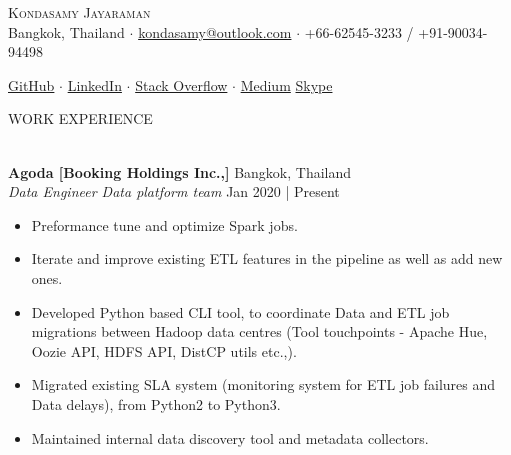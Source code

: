 \documentclass[a4paper]{article}
\newcommand{\lineunder} {
    \vspace*{-8pt} \\
    \hspace*{-18pt} \hrulefill \\
}
\newcommand{\header} [1] {
    {\hspace*{-18pt}\vspace*{6pt} \textsc{#1}}
    \vspace*{-6pt} \lineunder
}
\begin{document}
\vspace*{-50pt}

    

\vspace*{-12pt}
\begin{center}
	{\Huge \scshape {Kondasamy Jayaraman}}\\
	\vspace{1mm}
	\faMapMarker \hspace{.5mm} Bangkok, Thailand $\cdot$ 
	\faEnvelope \hspace{.5mm} \href{mailto:kondasamy@outlook.com}{kondasamy@outlook.com} $\cdot$ \faMobile \hspace{.5mm} +66-62545-3233 / \faWhatsapp  \hspace{.5mm} +91-90034-94498
		
	\faGithub \hspace{.5mm} \href{https://github.com/Kondasamy}{GitHub} $\cdot$
	\faLinkedin \hspace{.5mm} \href{https://www.linkedin.com/in/kondasamy/}{LinkedIn} $\cdot$
	\faStackOverflow \hspace{.5mm} \href{https://stackoverflow.com/users/2094099/kondasamy-jayaraman}{Stack Overflow} $\cdot$
	\faMedium \hspace{.5mm} \href{https://medium.com/@kondasamy}{Medium}
	\faSkype \hspace{.5mm} \href{https://join.skype.com/invite/n0IMYwGkGwQ1}{Skype}\\
\end{center}

\header{WORK EXPERIENCE}
\vspace{1mm}

\textbf{Agoda [Booking Holdings Inc.,]} \hfill Bangkok, Thailand\\
\textit{Data Engineer \textbar{} Data platform team} \hfill Jan 2020 | Present\\
\vspace{-1.5mm}
\begin{itemize} \setlength\itemsep{-0.3em}
    \item Preformance tune and optimize Spark jobs.
    \item Iterate and improve existing ETL features in the pipeline as well as add new ones.
    \item Developed Python based CLI tool, to coordinate Data and ETL job migrations between Hadoop data centres (Tool touchpoints - Apache Hue, Oozie API, HDFS API, DistCP utils etc.,).
	\item Migrated existing SLA system (monitoring system for ETL job failures and Data delays), from Python2 to Python3.
	\item Maintained internal data discovery tool and metadata collectors.
\end{itemize}
\end{document}
